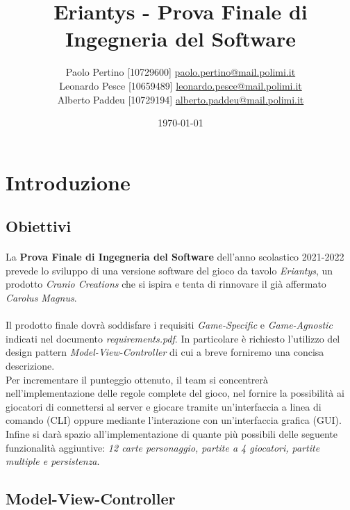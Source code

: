 \documentclass[a4paper, 12pt]{article}
\title{Eriantys - Prova Finale di Ingegneria del Software}
\author{
	Paolo Pertino [10729600]
	\href{mailto:paolo.pertino@mail.polimi.it}{paolo.pertino@mail.polimi.it} \\
	Leonardo Pesce [10659489]
	\href{mailto:leonardo.pesce@mail.polimi.it}{leonardo.pesce@mail.polimi.it} \\
	Alberto Paddeu [10729194]
	\href{mailto:alberto.paddeu@mail.polimi.it}{alberto.paddeu@mail.polimi.it} \\
}
\begin{document}
	\date{\today}
	\maketitle
	\newpage
	
	\tableofcontents
	
	\newpage
	\section{Introduzione}
	\subsection{Obiettivi}
	\paragraph{}
	La \textbf{Prova Finale di Ingegneria del Software} dell'anno scolastico 2021-2022 prevede lo sviluppo di una versione software del gioco da tavolo \emph{Eriantys}, un prodotto \emph{Cranio Creations}\cite{eriantys} che si ispira e tenta di rinnovare il già affermato \emph{Carolus Magnus}\cite{carolusMagnus}.
	
	\paragraph{}
	Il prodotto finale dovrà soddisfare i requisiti \emph{Game-Specific} e \emph{Game-Agnostic} indicati nel documento \emph{requirements.pdf}. In particolare è richiesto l'utilizzo del design pattern \emph{Model-View-Controller} di cui a breve forniremo una concisa descrizione.\\
	Per incrementare il punteggio ottenuto, il team si concentrerà nell'implementazione delle regole complete del gioco, nel fornire la possibilità ai giocatori di connettersi al server e giocare tramite un'interfaccia a linea di comando (CLI) oppure mediante l'interazione con un'interfaccia grafica (GUI). Infine si darà spazio all'implementazione di quante più possibili delle seguente funzionalità aggiuntive: \emph{12 carte personaggio, partite a 4 giocatori, partite multiple e persistenza}.
	
	\subsection{Model-View-Controller}
\end{document}
